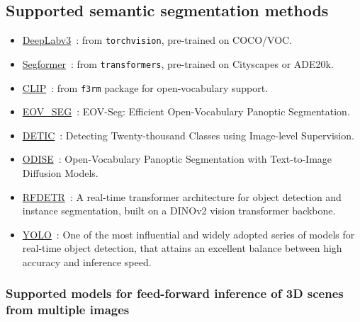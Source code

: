 \documentclass{article}
\providecommand{\tightlist}{%
  \setlength{\itemsep}{0pt}\setlength{\parskip}{0pt}}
\begin{document}
\hypertarget{supported-semantic-segmentation-methods}{%
\subsection{Supported semantic segmentation
methods}\label{supported-semantic-segmentation-methods}}

\begin{itemize}
\tightlist
\item
  \href{https://arxiv.org/abs/1706.05587}{DeepLabv3}~\cite{chen2017rethinking}: from \texttt{torchvision}, pre-trained on COCO/VOC.
\item
  \href{https://arxiv.org/abs/2105.15203}{Segformer}~\cite{xie2021segformer}: from \texttt{transformers}, pre-trained on Cityscapes or ADE20k.
\item
  \href{https://arxiv.org/abs/2212.09506}{CLIP}~\cite{lin2023clip}: from \texttt{f3rm} package for open-vocabulary support.
\item
  \href{https://arxiv.org/abs/2412.08628v1}{EOV\_SEG}~\cite{eov_seg}: EOV-Seg: Efficient Open-Vocabulary Panoptic Segmentation.
\item
  \href{https://arxiv.org/abs/2201.02605}{DETIC}~\cite{detic}: Detecting Twenty-thousand Classes using Image-level Supervision.
\item
  \href{https://arxiv.org/abs/2303.04803}{ODISE}~\cite{odise}: Open-Vocabulary Panoptic Segmentation with Text-to-Image Diffusion Models.
\item
  \href{https://arxiv.org/abs/2511.09554}{RFDETR}~\cite{rfdetr}: A real-time transformer architecture for object detection and instance segmentation, built on a DINOv2 vision transformer backbone.
\item
  \href{https://arxiv.org/abs/2510.09653}{YOLO}~\cite{sapkota2025ultralytics}: One of the most influential and widely adopted series of models for real-time object detection, that attains an excellent balance
between high accuracy and inference speed.
\end{itemize}
\hypertarget{supported-models-for-feed-forward-inference-of-3d-scenes-from-multiple-images}{%
\subsubsection{Supported models for feed-forward inference of 3D scenes
from multiple
images}\label{supported-models-for-feed-forward-inference-of-3d-scenes-from-multiple-images}}
\end{document}

